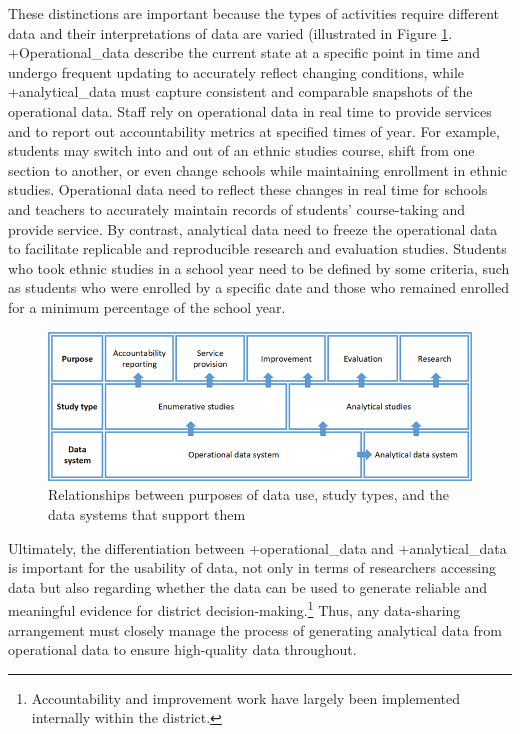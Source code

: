 \documentclass[
]{book}
\begin{document}
These distinctions are important because the types of activities require different data and their interpretations of data are varied (illustrated in Figure \ref{fig:sfusdfigure1}. +Operational\_data\textbar{} describe the current state at a specific point in time and undergo frequent updating to accurately reflect changing conditions, while +analytical\_data\textbar{} must capture consistent and comparable snapshots of the operational data. Staff rely on operational data in real time to provide services and to report out accountability metrics at specified times of year. For example, students may switch into and out of an ethnic studies course, shift from one section to another, or even change schools while maintaining enrollment in ethnic studies. Operational data need to reflect these changes in real time for schools and teachers to accurately maintain records of students' course-taking and provide service. By contrast, analytical data need to freeze the operational data to facilitate replicable and reproducible research and evaluation studies. Students who took ethnic studies in a school year need to be defined by some criteria, such as students who were enrolled by a specific date and those who remained enrolled for a minimum percentage of the school year.

\begin{figure}
\includegraphics[width=1\linewidth]{./assets/sfusd/sfusdfigure1web} \caption{Relationships between purposes of data use, study types, and the data systems that support them}\label{fig:sfusdfigure1}
\end{figure}

Ultimately, the differentiation between +operational\_data\textbar{} and +analytical\_data\textbar{} is important for the usability of data, not only in terms of researchers accessing data but also regarding whether the data can be used to generate reliable and meaningful evidence for district decision-making.\footnote{Accountability and improvement work have largely been implemented internally within the district.} Thus, any data-sharing arrangement must closely manage the process of generating analytical data from operational data to ensure high-quality data throughout.
\end{document}
